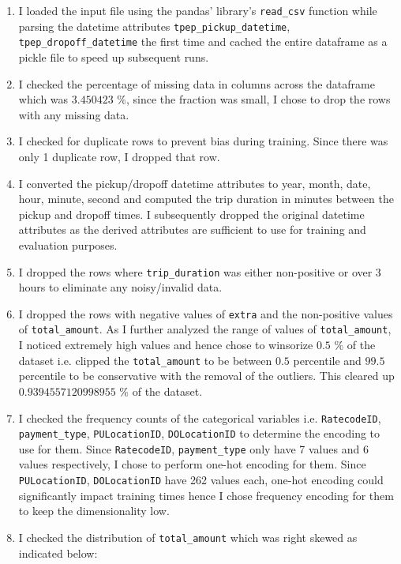 \documentclass{article}
\begin{document}
\begin{enumerate}
    \item I loaded the input file using the pandas' library's \verb|read_csv| function while parsing the datetime attributes \verb|tpep_pickup_datetime|, \\ 
    \verb|tpep_dropoff_datetime| the first time and cached 
    the entire dataframe as a pickle file to speed up subsequent runs.
    \item I checked the percentage of missing data in columns across the dataframe which was $3.450423$ \%, since the fraction was small, I chose to drop the rows with any missing data.
    \item I checked for duplicate rows to prevent bias during training. Since there was only 1 duplicate row, I dropped that row.
    \item I converted the pickup/dropoff datetime attributes to year, month, date, hour, minute, second and computed the trip duration in minutes between the pickup and dropoff times. I subsequently dropped the original datetime attributes as the derived attributes are sufficient to use for training and evaluation purposes.
    \item I dropped the rows where \verb|trip_duration| was either non-positive or over 3 hours to eliminate any noisy/invalid data.
    \item I dropped the rows with negative values of \verb|extra| and the non-positive values of \verb|total_amount|. As I further analyzed the range of values of \verb|total_amount|, I noticed extremely high values and hence chose to winsorize $0.5$ \% of the dataset i.e. clipped the \verb|total_amount| to be between $0.5$ percentile and $99.5$ percentile to be conservative with the removal of the outliers. This cleared up $0.9394557120998955$ \% of the dataset. 
    \item I checked the frequency counts of the categorical variables i.e. \verb|RatecodeID|, \verb|payment_type|, \verb|PULocationID|, \verb|DOLocationID| to determine the encoding to use for them. Since \verb|RatecodeID|, \verb|payment_type| only have 7 values and 6 values respectively, I chose to perform one-hot encoding for them. Since \verb|PULocationID|, \verb|DOLocationID| have 262 values each, one-hot encoding could significantly impact training times hence I chose frequency encoding for them to keep the dimensionality low.
    \item I checked the distribution of \verb|total_amount| which was right skewed as indicated below:


\end{enumerate}
\end{document}
